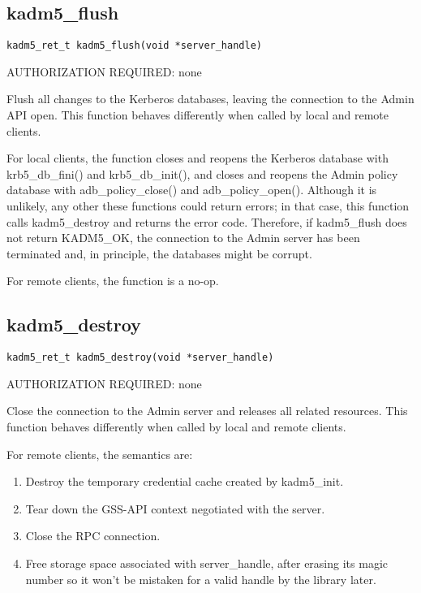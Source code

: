 \subsection{kadm5_flush}

\begin{verbatim}
kadm5_ret_t kadm5_flush(void *server_handle)
\end{verbatim}

AUTHORIZATION REQUIRED: none

Flush all changes to the Kerberos databases, leaving the connection to
the Admin API open.  This function behaves differently when called by
local and remote clients.

For local clients, the function closes and reopens the Kerberos
database with krb5_db_fini() and krb5_db_init(), and closes and
reopens the Admin policy database with adb_policy_close() and
adb_policy_open().  Although it is unlikely, any other these functions
could return errors; in that case, this function calls
kadm5_destroy and returns the error code.  Therefore, if
kadm5_flush does not return KADM5_OK, the connection to the
Admin server has been terminated and, in principle, the databases
might be corrupt.

For remote clients, the function is a no-op.

\subsection{kadm5_destroy}

\begin{verbatim}
kadm5_ret_t kadm5_destroy(void *server_handle)
\end{verbatim}

AUTHORIZATION REQUIRED: none

Close the connection to the Admin server and releases all related
resources.  This function behaves differently when called by local and
remote clients.

For remote clients, the semantics are:

\begin{enumerate}
\item Destroy the temporary credential cache created by
kadm5_init.

\item Tear down the GSS-API context negotiated with the server.

\item Close the RPC connection.

\item Free storage space associated with server_handle, after erasing
its magic number so it won't be mistaken for a valid handle by the
library later.
\end{enumerate}

